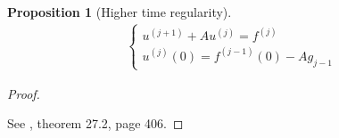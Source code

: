 \documentclass[english,a4paper,9pt,oneside]{scrbook}	%
\theoremstyle{break}
\newtheorem{prop}[equation]{Proposition}
\newenvironment{mproof}[1][\proofname]{%
  \begin{proof}[#1]$ $\par\nobreak\ignorespaces
}{%
  \end{proof}
}
\renewcommand*{\proofname}{Proof}
\theoremstyle{remark}
\begin{document}
\begin{appendices}
\begin{prop}[Higher time regularity]
\begin{align*}
\left\{\begin{matrix}
u^{(j+1)}+Au^{(j)} = f^{(j)}
\\
u^{(j)}(0) = f^{(j-1)}(0) - Ag_{j-1}
\end{matrix}\right.
\end{align*}



\end{prop}

\begin{mproof}

See \cite{wloka}, theorem 27.2, page 406.
\end{mproof}



\end{appendices}
\end{document}
